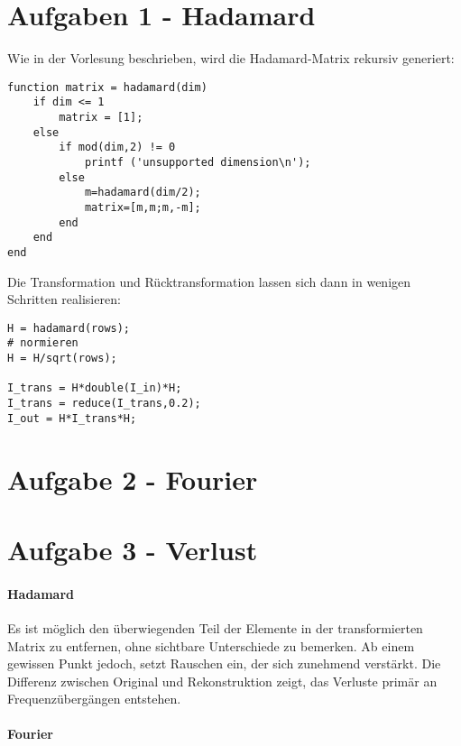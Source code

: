 




\newcommand{\nr}{1}


\section*{Aufgaben 1 - Hadamard}
Wie in der Vorlesung beschrieben, wird die Hadamard-Matrix rekursiv generiert:

\lstset{language=matlab}
\begin{lstlisting}[]
function matrix = hadamard(dim)
    if dim <= 1
        matrix = [1];
    else
        if mod(dim,2) != 0
            printf ('unsupported dimension\n');
        else
            m=hadamard(dim/2);
            matrix=[m,m;m,-m];
        end
    end
end
\end{lstlisting}

Die Transformation und R\"ucktransformation lassen sich dann in wenigen Schritten realisieren:


\lstset{language=matlab}
\begin{lstlisting}[]
H = hadamard(rows);
# normieren
H = H/sqrt(rows);

I_trans = H*double(I_in)*H;
I_trans = reduce(I_trans,0.2);
I_out = H*I_trans*H;
\end{lstlisting}

\section*{Aufgabe 2 - Fourier} 

\section*{Aufgabe 3 - Verlust}
\paragraph{Hadamard}
Es ist m\"oglich den \"uberwiegenden Teil der Elemente in der transformierten 
Matrix zu entfernen, ohne sichtbare Unterschiede zu bemerken. Ab einem gewissen
Punkt jedoch, setzt Rauschen ein, der sich zunehmend verst\"arkt. Die Differenz
zwischen Original und Rekonstruktion zeigt, das Verluste prim\"ar an Frequenz\"uberg\"angen
entstehen.

\paragraph{Fourier}


